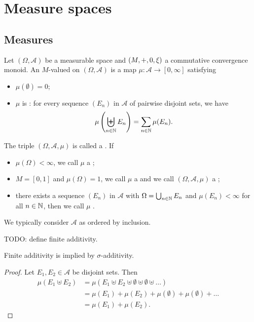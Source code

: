 \section{Measure spaces}
\subsection{Measures}
\begin{definition}
Let $(\Omega,\mathcal{A})$ be a measurable space and $\left( M,+,0,\xi \right)$ a commutative convergence monoid. An $M$-valued  on $(\Omega,\mathcal{A})$ is a map $\mu: \mathcal{A} \to [0,\infty]$ satisfying
\begin{itemize}
\item $\mu(\emptyset) = 0$;
\item $\mu$ is : for every sequence $(E_n)$ in $\mathcal{A}$ of pairwise disjoint sets, we have
\[ \mu\left(\biguplus_{n\in\mathbb{N}}E_n\right) = \sum_{n\in\mathbb{N}}\mu(E_n). \]
\end{itemize}
The triple $(\Omega, \mathcal{A}, \mu)$ is called a . If
\begin{itemize}
\item $\mu(\Omega) < \infty$, we call $\mu$ a ;
\item $M = [0,1]$ and $\mu(\Omega) = 1$, we call $\mu$ a  and we call $(\Omega, \mathcal{A}, \mu)$ a ;
\item there exists a sequence $(E_n)$ in $\mathcal{A}$ with $\Omega = \bigcup_{n\in\mathbb{N}}E_n$ and $\mu(E_n)<\infty$ for all $n\in\mathbb{N}$, then we call $\mu$ .
\end{itemize}
\end{definition}
We typically consider $\mathcal{A}$ as ordered by inclusion.

TODO: define finite additivity.

\begin{lemma}
Finite additivity is implied by $\sigma$-additivity.
\end{lemma}
\begin{proof}
Let $E_1,E_2\in\mathcal{A}$ be disjoint sets. Then
\begin{align*}
\mu(E_1\uplus E_2) &= \mu(E_1\uplus E_2 \uplus \emptyset \uplus \emptyset \uplus \ldots) \\
&= \mu(E_1) + \mu(E_2) + \mu(\emptyset) + \mu(\emptyset) + \ldots \\
&= \mu(E_1) + \mu(E_2).
\end{align*}
\end{proof}

